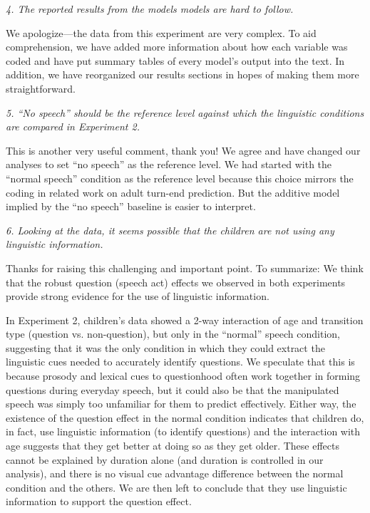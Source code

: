 \documentclass[11pt,a4paper]{letter} %
\begin{document}
\begin{letter}{}
\smallskip

\noindent \textit{4. The reported results from the models models are hard to follow.}

\noindent We apologize---the data from this experiment are very complex. To aid comprehension, we have added more information about how each variable was coded and have put summary tables of every model's output into the text. In addition, we have reorganized our results sections in hopes of making them more straightforward. 

\smallskip

\noindent \textit{5. ``No speech'' should be the reference level against which the linguistic conditions are compared in Experiment 2.}

\noindent This is another very useful comment, thank you! We agree and have changed our analyses to set ``no speech'' as the reference level. We had started with the ``normal speech'' condition as the reference level because this choice mirrors the coding in related work on adult turn-end prediction. But the additive model implied by the ``no speech'' baseline is easier to interpret. 

\noindent \textit{6. Looking at the data, it seems possible that the children are not using any linguistic information.}

\noindent Thanks for raising this challenging and important point. To summarize: We think that the robust question (speech act) effects we observed in both experiments provide strong evidence for the use of linguistic information.

In Experiment 2, children's data showed a 2-way interaction of age and transition type (question vs. non-question), but only in the ``normal'' speech condition, suggesting that it was the only condition in which they could extract the linguistic cues needed to accurately identify questions. We speculate that this is because prosody and lexical cues to questionhood often work together in forming questions during everyday speech, but it could also be that the manipulated speech was simply too unfamiliar for them to predict effectively. Either way, the existence of the question effect in the normal condition indicates that children do, in fact, use linguistic information (to identify questions) and the interaction with age suggests that they get better at doing so as they get older. These effects cannot be explained by duration alone (and duration is controlled in our analysis), and there is no visual cue advantage difference between the normal condition and the others. We are then left to conclude that they use linguistic information to support the question effect. 


\end{letter}
\end{document}
